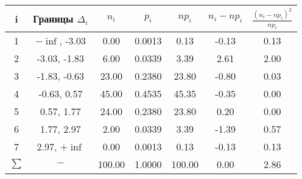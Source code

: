 \begin{tabular}{|c|c|c|c|c|c|c|}
\hline
\hline i & Границы $\Delta_i$ & $n_i$ & $p_i$ & $np_i$ & $n_i - np_i$ & $\frac{(n_i - np_i)^2}{np_i}$\\
\hline
1 & $-\inf$, -3.03 & 0.00 & 0.0013 & 0.13 & -0.13 & 0.13\\
\hline
2 & -3.03, -1.83 & 6.00 & 0.0339 & 3.39 & 2.61 & 2.00\\
\hline
3 & -1.83, -0.63 & 23.00 & 0.2380 & 23.80 & -0.80 & 0.03\\
\hline
4 & -0.63, 0.57 & 45.00 & 0.4535 & 45.35 & -0.35 & 0.00\\
\hline
5 & 0.57, 1.77 & 24.00 & 0.2380 & 23.80 & 0.20 & 0.00\\
\hline
6 & 1.77, 2.97 & 2.00 & 0.0339 & 3.39 & -1.39 & 0.57\\
\hline
7 & 2.97, $+\inf$ & 0.00 & 0.0013 & 0.13 & -0.13 & 0.13\\
\hline
$\sum$ & $-$ & 100.00 & 1.0000 & 100.00 & 0.00 & 2.86\\
\hline
\end{tabular}